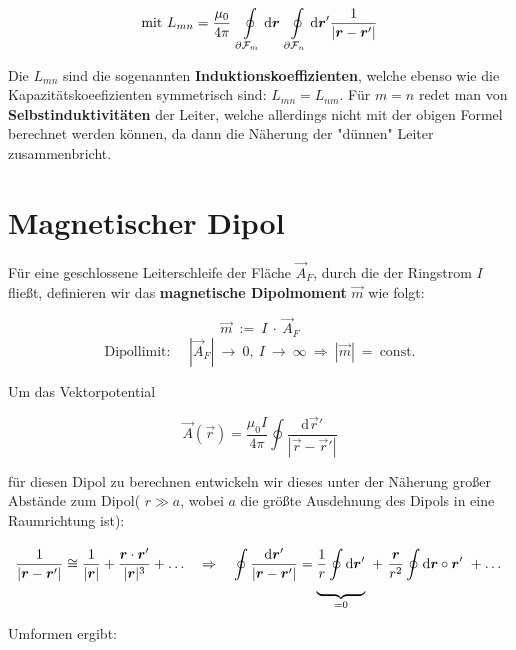 \begin{equation*}
\text{mit } L_{mn} = \frac{\mu_0}{4\pi} \ \Oint{\partial\mathcal{F}_m}{}{\vec{r}}\ \Oint{\partial\mathcal{F}_n}{}{\vec{r}'}\frac{1}{|\vec{r}-\vec{r}'|}
\end{equation*}

Die $L_{mn}$ sind die sogenannten \textbf{Induktionskoeffizienten}, welche ebenso wie die Kapazitätskoeefizienten symmetrisch sind: $L_{mn} = L_{nm}$. Für $m=n$ redet man von \textbf{Selbstinduktivitäten} der Leiter, welche allerdings  nicht mit der obigen Formel berechnet werden können, da dann die Näherung der "dünnen" Leiter zusammenbricht.

\section{Magnetischer Dipol}

Für eine geschlossene Leiterschleife der Fläche $\vec{A}_F$, durch die der Ringstrom $I$ fließt, definieren wir das \textbf{magnetische Dipolmoment} $\vec{m}$ wie folgt:

\begin{equation*}
\vec{m} \ := \ I \ \cdot \ \vec{A}_F
\end{equation*}
\begin{equation*}
\text{Dipollimit: } \quad |\vec{A}_F| \ \rightarrow \ 0, \ I \ \rightarrow \ \infty \ \Rightarrow \ |\vec{m}| \ = \ \text{const.}
\end{equation*}

Um das Vektorpotential

\begin{equation*}
\vec{A}(\vec{r}) = \frac{\mu_0 I}{4\pi}\oint\frac{\mathrm{d}\vec{r}'}{|\vec{r}-\vec{r}'|}
\end{equation*}

für diesen Dipol zu berechnen entwickeln wir dieses unter der Näherung großer Abstände zum Dipol( $r\gg a$, wobei $a$ die größte Ausdehnung des Dipols in eine Raumrichtung ist):

\begin{equation*}
\frac{1}{|\vec{r}-\vec{r}'|} \cong  \frac{1}{|\vec{r}|} + \frac{\vec{r}\cdot\vec{r}'}{|\vec{r}|^3} + \dotsc \quad \Rightarrow \quad \oint\frac{\mathrm{d}\vec{r}'}{|\vec{r}-\vec{r}'|} = \underbrace{\frac{1}{r} \Oint{}{}{\vec{r}'}}_{=0} \ + \ \frac{\vec{r}}{r^2}\Oint{}{}{\vec{r}} \circ\vec{r}' \ + \dotsc
\end{equation*}

Umformen ergibt:

